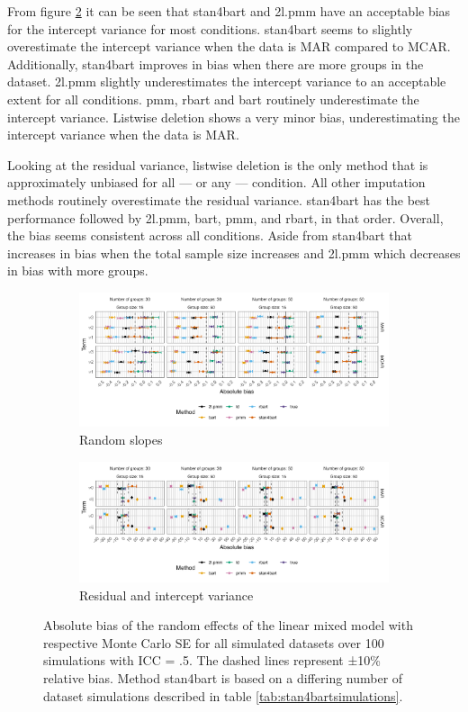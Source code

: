 \documentclass[3p,12pt,a4paper]{elsarticle}
\begin{document}
From figure \ref{fig:bias2} it can be seen that stan4bart and 2l.pmm have an acceptable bias for the intercept variance for most conditions. stan4bart seems to slightly overestimate the intercept variance when the data is MAR compared to MCAR. Additionally, stan4bart improves in bias when there are more groups in the dataset. 2l.pmm slightly underestimates the intercept variance to an acceptable extent for all conditions. pmm, rbart and bart routinely underestimate the intercept variance. Listwise deletion shows a very minor bias, underestimating the intercept variance when the data is MAR. 

Looking at the residual variance, listwise deletion is the only method that is approximately unbiased for all --- or any --- condition. All other imputation methods routinely overestimate the residual variance. stan4bart has the best performance followed by 2l.pmm, bart, pmm, and rbart, in that order. Overall, the bias seems consistent across all conditions. Aside from stan4bart that increases in bias when the total sample size increases and 2l.pmm which decreases in bias with more groups. 

\begin{figure}[H]
    \centering 
    \begin{subfigure}[b]{1\textwidth}
        \centering
        \includegraphics[width=1\textwidth]{biasrandom.png}
        \caption{Random slopes}
        \label{fig:biasrandom}
    \end{subfigure}
    \begin{subfigure}[b]{1\textwidth}
        \centering
        \includegraphics[width=1\textwidth]{bias2.png}
        \caption{Residual and intercept variance}
        \label{fig:bias2}
    \end{subfigure}
    \caption{Absolute bias of the random effects of the linear mixed model with respective Monte Carlo SE for all simulated datasets over 100 simulations with ICC = .5. The dashed lines represent ±10\% relative bias. Method stan4bart is based on a differing number of dataset simulations described in table \ref{tab:stan4bartsimulations}.}
    \label{fig:biasrandom2}
\end{figure}
\end{document}
